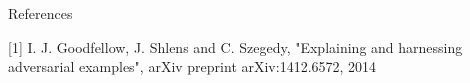 \begin{tframe}{References}

[1] I. J. Goodfellow, J. Shlens and C. Szegedy, "Explaining and harnessing adversarial examples", arXiv preprint arXiv:1412.6572, 2014

\vspace{0.1in}

\end{tframe}
